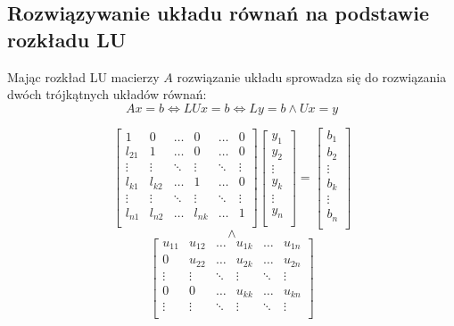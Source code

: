 \documentclass{article}
\begin{document}
\subsection{Rozwiązywanie układu równań na podstawie rozkładu LU}
Mając rozkład LU macierzy $A$ rozwiązanie układu sprowadza się do rozwiązania dwóch trójkątnych układów równań:
$$
Ax = b \iff LUx = b \iff Ly = b \land Ux = y
$$    
\begin{center}
    $$
    \begin{bmatrix}
        1 & 0 & \dots & 0 & \dots & 0 \\
        l_{21} & 1 & \dots & 0 & \dots & 0 \\
        \vdots & \vdots & \ddots &\vdots & \ddots & \vdots \\
        l_{k1} & l_{k2} & \dots & 1 & \dots & 0 \\
        \vdots & \vdots & \ddots & \vdots & \ddots & \vdots \\
        l_{n1} & l_{n2} & \dots & l_{nk} & \dots & 1 \\
    \end{bmatrix}
    \begin{bmatrix}
        y_{1} \\
        y_{2} \\
        \vdots \\
        y_{k} \\
        \vdots \\
        y_{n} \\
    \end{bmatrix}
    =
    \begin{bmatrix}
        b_{1} \\
        b_{2} \\
        \vdots \\
        b_{k} \\
        \vdots \\
        b_{n} \\
    \end{bmatrix}
    $$
    $$
    \land
    $$
    $$
    \begin{bmatrix}
        u_{11} & u_{12} & \dots & u_{1k} & \dots & u_{1n} \\
        0 & u_{22} & \dots & u_{2k} & \dots & u_{2n} \\
        \vdots & \vdots & \ddots &\vdots & \ddots & \vdots \\
        0 & 0 & \dots & u_{kk} & \dots & u_{kn} \\
        \vdots & \vdots & \ddots & \vdots & \ddots & \vdots \\

\end{bmatrix}$$
\end{center}
\end{document}
